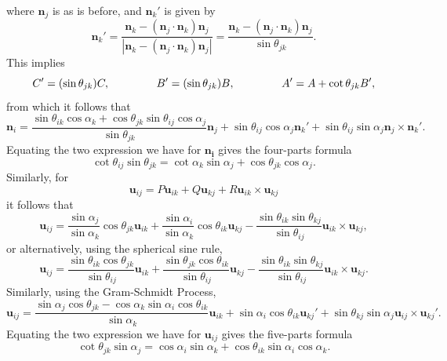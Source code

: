\documentclass[fleqn,11pt,twoside]{article}
\theoremstyle{definition}
\begin{document}
where $\mathbf{n}_j$ is as is before, and $\mathbf{n}_k'$ is given by
\begin{equation}
\mathbf{n}_k'=\frac{\mathbf{n}_k-(\mathbf{n}_j\cdot\mathbf{n}_k)\mathbf{n}_j}{|\mathbf{n}_k-(\mathbf{n}_j\cdot\mathbf{n}_k)\mathbf{n}_j|}
=\frac{\mathbf{n}_k-(\mathbf{n}_j\cdot\mathbf{n}_k)\mathbf{n}_j}{\sin\theta_{jk}}.
\end{equation}
This implies
\begin{equation}
C'=(\sin\theta_{jk})C,\hspace{15mm}B'=(\sin\theta_{jk})B,\hspace{15mm}A'=A+\cot\theta_{jk}B',
\end{equation}
from which it follows that
\begin{equation}
\mathbf{n}_i=\frac{\sin\theta_{ik}\cos\alpha_k+\cos\theta_{jk}\sin\theta_{ij}\cos\alpha_j}{\sin\theta_{jk}}\mathbf{n}_{j}+\sin\theta_{ij}
\cos\alpha_j\mathbf{n}_{k}'+\sin\theta_{ij}\sin\alpha_j\mathbf{n}_{j}\times\mathbf{n}_{k}'.
\end{equation}
Equating the two expression we have for $\mathbf{n_i}$ gives the four-parts formula
\begin{equation}
\cot\theta_{ij}\sin\theta_{jk}=\cot\alpha_k\sin\alpha_j+\cos\theta_{jk}\cos\alpha_j.
\end{equation}
Similarly, for 
\begin{equation}
\mathbf{u}_{ij}=P\mathbf{u}_{ik}+Q\mathbf{u}_{kj}+R\mathbf{u}_{ik}\times\mathbf{u}_{kj}
\end{equation}
it follows that
\begin{equation}
\mathbf{u}_{ij}=\frac{\sin\alpha_j}{\sin\alpha_k}\cos\theta_{jk}\mathbf{u}_{ik}
+\frac{\sin\alpha_i}{\sin\alpha_k}\cos\theta_{ik}\mathbf{u}_{kj}-
\frac{\sin\theta_{ik}\sin\theta_{kj}}{\sin\theta_{ij}}\mathbf{u}_{ik}\times\mathbf{u}_{kj},
\end{equation}
or alternatively, using the spherical sine rule,
\begin{equation}
\mathbf{u}_{ij}=\frac{\sin\theta_{ik}\cos\theta_{jk}}{\sin\theta_{ij}}\mathbf{u}_{ik}
+\frac{\sin\theta_{jk}\cos\theta_{ik}}{\sin\theta_{ij}}\mathbf{u}_{kj}-
\frac{\sin\theta_{ik}\sin\theta_{kj}}{\sin\theta_{ij}}\mathbf{u}_{ik}\times\mathbf{u}_{kj}.
\end{equation}
Similarly, using the Gram-Schmidt Process,
\begin{equation}
\mathbf{u}_{ij}=\frac{\sin\alpha_{j}\cos\theta_{jk}-\cos\alpha_k\sin\alpha_i\cos\theta_{ik}}{\sin\alpha_{k}}\mathbf{u}_{ik}+\sin\alpha_i\cos\theta_{ik}\mathbf{u}_{kj}'+\sin\theta_{kj}\sin\alpha_j\mathbf{u}_{ij}\times\mathbf{u}_{kj}'.
\end{equation}
Equating the two expression we have for $\mathbf{u}_{ij}$ gives the five-parts formula
\begin{equation}
\cot\theta_{jk}\sin\alpha_{j}=\cos\alpha_i\sin\alpha_k+\cos\theta_{ik}\sin\alpha_i\cos\alpha_k.
\end{equation}
\end{document}
